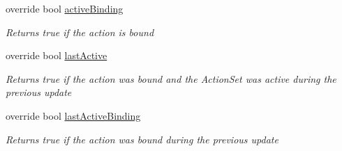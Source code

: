 \begin{DoxyCompactItemize}
override bool \mbox{\hyperlink{class_valve_1_1_v_r_1_1_steam_v_r___action___vector3___source_af9cc09790293315e43a2fd282270a5d3}{active\+Binding}}
\begin{DoxyCompactList}\small\item\em Returns true if the action is bound \end{DoxyCompactList}\item 
override bool \mbox{\hyperlink{class_valve_1_1_v_r_1_1_steam_v_r___action___vector3___source_a56ea7f665f4e5146e34432829375ec62}{last\+Active}}
\begin{DoxyCompactList}\small\item\em Returns true if the action was bound and the Action\+Set was active during the previous update \end{DoxyCompactList}\item 
override bool \mbox{\hyperlink{class_valve_1_1_v_r_1_1_steam_v_r___action___vector3___source_aa6005e20a2690c1c4cf84c20ac5e1409}{last\+Active\+Binding}}
\begin{DoxyCompactList}\small\item\em Returns true if the action was bound during the previous update \end{DoxyCompactList}\end{DoxyCompactItemize}

